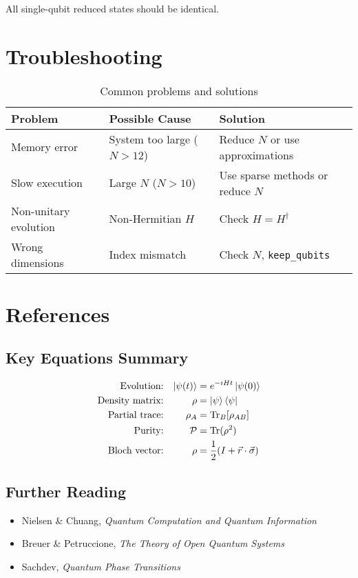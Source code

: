 \documentclass[11pt,a4paper]{article}
\begin{document}
All single-qubit reduced states should be identical.

\section{Troubleshooting}

\begin{table}[h]
\centering
\small
\begin{tabular}{|p{4cm}|p{4cm}|p{5cm}|}
\hline
\textbf{Problem} & \textbf{Possible Cause} & \textbf{Solution} \\
\hline
Memory error & System too large ($N > 12$) & Reduce $N$ or use approximations \\
\hline
Slow execution & Large $N$ ($N > 10$) & Use sparse methods or reduce $N$ \\
\hline
Non-unitary evolution & Non-Hermitian $H$ & Check $H = H^\dagger$ \\
\hline
Wrong dimensions & Index mismatch & Check $N$, \texttt{keep\_qubits} \\
\hline
\end{tabular}
\caption{Common problems and solutions}
\end{table}

\section{References}

\subsection{Key Equations Summary}

\begin{align}
    \text{Evolution:} && \ket{\psi(t)} &= e^{-iHt}\ket{\psi(0)} \\
    \text{Density matrix:} && \rho &= \ket{\psi}\bra{\psi} \\
    \text{Partial trace:} && \rho_A &= \text{Tr}_B[\rho_{AB}] \\
    \text{Purity:} && \mathcal{P} &= \text{Tr}(\rho^2) \\
    \text{Bloch vector:} && \rho &= \frac{1}{2}(I + \vec{r} \cdot \vec{\sigma})
\end{align}

\subsection{Further Reading}

\begin{itemize}
    \item Nielsen \& Chuang, \textit{Quantum Computation and Quantum Information}
    \item Breuer \& Petruccione, \textit{The Theory of Open Quantum Systems}
    \item Sachdev, \textit{Quantum Phase Transitions}
\end{itemize}
\end{document}
